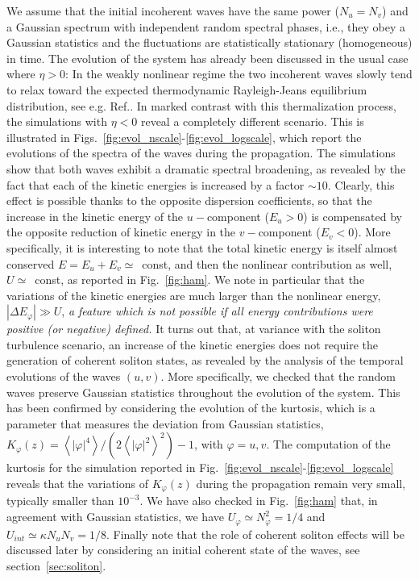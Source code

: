 \documentclass[pra,twocolumn,showpacs,preprintnumbers,amsmath,amssymb]{revtex4}
\def\vfi{\varphi}
\begin{document}
We assume that the initial incoherent waves have the same power ($N_u=N_v$) and a Gaussian spectrum 
with independent random spectral phases, i.e., they obey a Gaussian statistics and the fluctuations are statistically stationary (homogeneous) in time.
The evolution of the system has already been discussed in the usual case where $\eta > 0$: In the weakly nonlinear regime the two incoherent waves slowly tend to relax toward the expected thermodynamic Rayleigh-Jeans  equilibrium distribution, see e.g. Ref.\cite{PRL10}.
In marked contrast with this thermalization process, the simulations with $\eta < 0$ reveal a completely different scenario.
This is illustrated in Figs.~\ref{fig:evol_nscale}-\ref{fig:evol_logscale}, which report the evolutions of the spectra of the waves during the propagation.
The simulations show that both waves exhibit a dramatic spectral broadening, as revealed by the fact that each of the kinetic energies is increased by a factor $\sim 10$.
Clearly, this effect is possible thanks to the opposite dispersion coefficients, so that the increase in the kinetic energy of the $u-$component ($E_u >0$) is compensated by the opposite reduction of kinetic energy in the $v-$component ($E_v < 0$).
More specifically, it is interesting to note that the total kinetic energy is itself almost conserved $E = E_u + E_v \simeq$~const, and then the nonlinear contribution as well, $U \simeq $~const, as reported in Fig.~\ref{fig:ham}.
We note in particular that the variations of the kinetic energies are much larger than the nonlinear energy, $|\Delta E_\vfi|  \gg U$, {\it a feature which is not possible if all energy contributions were positive (or negative) defined.}
It turns out that, at variance with the soliton turbulence scenario, an increase of the kinetic energies does not require the generation of coherent soliton states, as revealed by the analysis of the temporal evolutions of the waves $(u, v)$.
More specifically, we checked that the random waves preserve Gaussian statistics throughout the evolution of the system.
This has been confirmed by considering the evolution of the kurtosis, which is a parameter  that measures the deviation from Gaussian statistics, $K_{\vfi}(z) = \left<|\vfi|^4 \right>/(2 \left<|\vfi|^2 \right>^2) -1$, with $\vfi = u,v$.
The computation of the kurtosis for the simulation reported in Fig.~\ref{fig:evol_nscale}-\ref{fig:evol_logscale} reveals that the variations of $K_{\vfi}(z)$ during the propagation  remain very small, typically smaller than $10^{-3}$.
We have also checked in Fig.~\ref{fig:ham} that, in agreement with Gaussian statistics, we have  $U_\vfi \simeq N_\vfi^2=1/4$ and $U_{int} \simeq \kappa N_u N_v =1/8$. 
Finally note that the role of coherent soliton effects will be discussed later by considering an initial coherent state of the waves, see section~\ref{sec:soliton}. 
\end{document}
